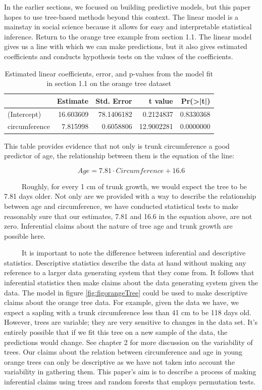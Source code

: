 \documentclass[12pt,twoside]{reedthesis}
\begin{document}
  In the earlier sections, we focused on building predictive models, but
  this paper hopes to use tree-based methods beyond this context. The
  linear model is a mainstay in social science because it allows for easy
  and interpretable statistical inference. Return to the orange tree
  example from section 1.1. The linear model gives us a line with which we
  can make predictions, but it also gives estimated coefficients and
  conducts hypothesis tests on the values of the coefficients.
  
  \begin{table}
  
  \caption{\label{tab:unnamed-chunk-11}\label{tab:tablmcoef}Estimated linear coefficients, error, and p-values from the model fit in section 1.1 on the orange tree dataset}
  \centering
  \begin{tabular}[t]{l|r|r|r|r}
  \hline
    & Estimate & Std. Error & t value & Pr(>|t|)\\
  \hline
  (Intercept) & 16.603609 & 78.1406182 & 0.2124837 & 0.8330368\\
  \hline
  circumference & 7.815998 & 0.6058806 & 12.9002281 & 0.0000000\\
  \hline
  \end{tabular}
  \end{table}
  
  This table provides evidence that not only is trunk circumference a good
  predictor of age, the relationship between them is the equation of the
  line:
  
  \[Age = 7.81 \cdot Circumference + 16.6\]
  
  ~~~~~Roughly, for every 1 cm of trunk growth, we would expect the tree
  to be 7.81 days older. Not only are we provided with a way to describe
  the relationship between age and circumference, we have conducted
  statistical tests to make reasonably sure that our estimates, 7.81 and
  16.6 in the equation above, are not zero. Inferential claims about the
  nature of tree age and trunk growth are possible here.
  
  ~~~~~It is important to note the difference between inferential and
  descriptive statistics. Descriptive statistics describe the data at hand
  without making any reference to a larger data generating system that
  they come from. It follows that inferential statistics then make claims
  about the data generating system given the data. The model in figure
  \ref{fig:figorangeTree} could be used to make descriptive claims about
  the orange tree data. For example, given the data we have, we expect a
  sapling with a trunk circumference less than 41 cm to be 118 days old.
  However, trees are variable; they are very sensitive to changes in the
  data set. It's entirely possible that if we fit this tree on a new
  sample of the data, the predictions would change. See chapter 2 for more
  discussion on the variability of trees. Our claims about the relation
  between circumference and age in young orange trees can only be
  descriptive as we have not taken into account the variability in
  gathering them. This paper's aim is to describe a process of making
  inferential claims using trees and random forests that employs
  permutation tests.
  
\end{document}

